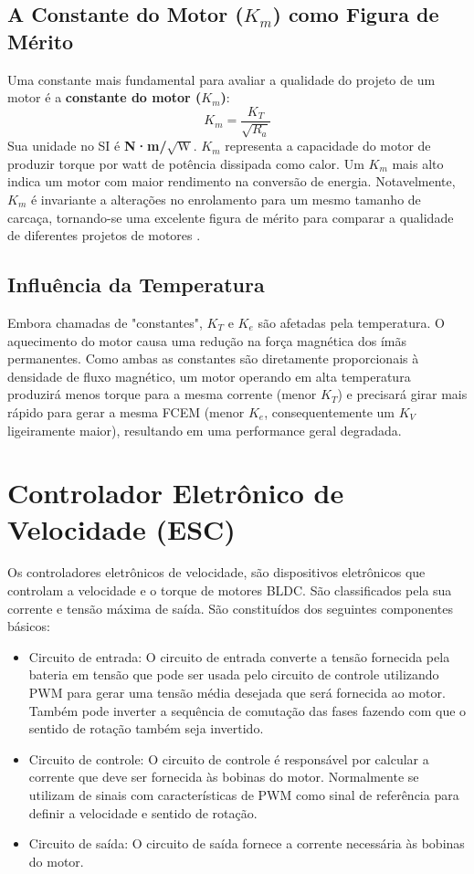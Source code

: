 \subsection{A Constante do Motor ($K_m$) como Figura de Mérito}

Uma constante mais fundamental para avaliar a qualidade do projeto de um motor é a \textbf{constante do motor ($K_m$)}:
\begin{equation}
    K_m = \frac{K_T}{\sqrt{R_a}}
\end{equation}
Sua unidade no SI é \textbf{N·m/$\sqrt{\text{W}}$}. $K_m$ representa a capacidade do motor de produzir torque por watt de potência dissipada como calor. Um $K_m$ mais alto indica um motor com maior rendimento na conversão de energia. Notavelmente, $K_m$ é invariante a alterações no enrolamento para um mesmo tamanho de carcaça, tornando-se uma excelente figura de mérito para comparar a qualidade de diferentes projetos de motores \parencite{infineon2011bldc}.

\subsection{Influência da Temperatura}

Embora chamadas de "constantes", $K_T$ e $K_e$ são afetadas pela temperatura. O aquecimento do motor causa uma redução na força magnética dos ímãs permanentes. Como ambas as constantes são diretamente proporcionais à densidade de fluxo magnético, um motor operando em alta temperatura produzirá menos torque para a mesma corrente (menor $K_T$) e precisará girar mais rápido para gerar a mesma FCEM (menor $K_e$, consequentemente um $K_V$ ligeiramente maior), resultando em uma performance geral degradada.

\section{Controlador Eletrônico de Velocidade (ESC)} 
 Os controladores eletrônicos de velocidade, são dispositivos eletrônicos que controlam a velocidade e o torque de motores BLDC. São classificados pela sua corrente e tensão máxima de saída. São constituídos dos seguintes componentes básicos: 

 \begin{itemize} 
 \item Circuito de entrada: O circuito de entrada converte a tensão fornecida pela bateria em tensão que pode ser usada pelo circuito de controle utilizando PWM para gerar uma tensão média desejada que será fornecida ao motor. Também pode inverter a sequência de comutação das fases fazendo com que o sentido de rotação também seja invertido. 
 \item Circuito de controle: O circuito de controle é responsável por calcular a corrente que deve ser fornecida às bobinas do motor. Normalmente se utilizam de sinais com características de PWM como sinal de referência para definir a velocidade e sentido de rotação. 
 \item Circuito de saída: O circuito de saída fornece a corrente necessária às bobinas do motor. 
 \end{itemize} 

